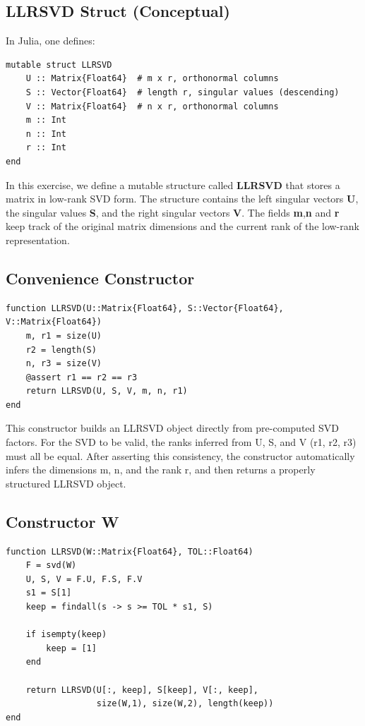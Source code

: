 \documentclass[11pt]{report}
\begin{document}
\subsection{LLRSVD Struct (Conceptual)}

In Julia, one defines:
\begin{verbatim}
mutable struct LLRSVD
    U :: Matrix{Float64}  # m x r, orthonormal columns
    S :: Vector{Float64}  # length r, singular values (descending)
    V :: Matrix{Float64}  # n x r, orthonormal columns
    m :: Int
    n :: Int
    r :: Int
end
\end{verbatim}

In this exercise, we define a mutable structure called \textbf{LLRSVD} that stores a matrix in low-rank SVD form. 
The structure contains the left singular vectors \textbf{U}, the singular values \textbf{S}, and the right singular vectors \textbf{V}. 
The fields \textbf{m},\textbf{n} and \textbf{r} keep track of the original matrix dimensions and the current rank of the low-rank representation.

\subsection{Convenience Constructor}

\begin{lstlisting}
function LLRSVD(U::Matrix{Float64}, S::Vector{Float64}, V::Matrix{Float64})
    m, r1 = size(U)
    r2 = length(S)
    n, r3 = size(V)
    @assert r1 == r2 == r3
    return LLRSVD(U, S, V, m, n, r1)
end
\end{lstlisting}

This constructor builds an LLRSVD object directly from pre-computed SVD factors. For the SVD to be valid, the ranks inferred from U, S, and V (r1, r2, r3) must all be equal. After asserting this consistency, the constructor automatically infers the dimensions m, n, and the rank r, and then returns a properly structured LLRSVD object.

\subsection{Constructor W}
\begin{lstlisting}
function LLRSVD(W::Matrix{Float64}, TOL::Float64)
    F = svd(W)
    U, S, V = F.U, F.S, F.V
    s1 = S[1]
    keep = findall(s -> s >= TOL * s1, S)

    if isempty(keep)
        keep = [1]
    end

    return LLRSVD(U[:, keep], S[keep], V[:, keep],
                  size(W,1), size(W,2), length(keep))
end
\end{lstlisting}
\end{document}
